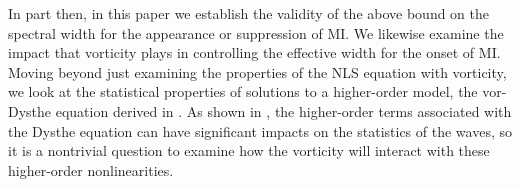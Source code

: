 \documentclass[a4paper,11pt]{article}
\begin{document}
In part then, in this paper we establish the validity of the above bound on the spectral width for the appearance or suppression of MI.  We likewise examine the impact that vorticity plays in controlling the effective width for the onset of MI.  Moving beyond just examining the properties of the NLS equation with vorticity, we look at the statistical properties of solutions to a higher-order model, the vor-Dysthe equation derived in \cite{curtis8}.  As shown in \cite{onorato}, the higher-order terms associated with the Dysthe equation can have significant impacts on the statistics of the waves, so it is a nontrivial question to examine how the vorticity will interact with these higher-order nonlinearities.  



\end{document}
